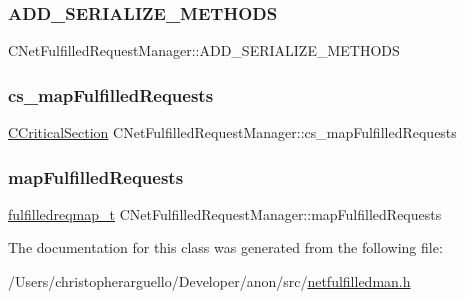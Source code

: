 \subsubsection{\texorpdfstring{A\+D\+D\+\_\+\+S\+E\+R\+I\+A\+L\+I\+Z\+E\+\_\+\+M\+E\+T\+H\+O\+DS}{ADD\_SERIALIZE\_METHODS}}
{\footnotesize\ttfamily C\+Net\+Fulfilled\+Request\+Manager\+::\+A\+D\+D\+\_\+\+S\+E\+R\+I\+A\+L\+I\+Z\+E\+\_\+\+M\+E\+T\+H\+O\+DS}

\mbox{\label{class_c_net_fulfilled_request_manager_a0bdc65b6b9e522c95cec8fe21f04cc72}} 
\subsubsection{\texorpdfstring{cs\+\_\+map\+Fulfilled\+Requests}{cs\_mapFulfilledRequests}}
{\footnotesize\ttfamily \mbox{\hyperlink{sync_8h_a37a4692b2d517f2843655ca11af7668a}{C\+Critical\+Section}} C\+Net\+Fulfilled\+Request\+Manager\+::cs\+\_\+map\+Fulfilled\+Requests\hspace{0.3cm}{\ttfamily [private]}}

\mbox{\label{class_c_net_fulfilled_request_manager_af0ebb4a55c60aca33d85295caa611ecf}} 
\subsubsection{\texorpdfstring{map\+Fulfilled\+Requests}{mapFulfilledRequests}}
{\footnotesize\ttfamily \mbox{\hyperlink{class_c_net_fulfilled_request_manager_a08e49de0fb5f459a2238c98720b1b420}{fulfilledreqmap\+\_\+t}} C\+Net\+Fulfilled\+Request\+Manager\+::map\+Fulfilled\+Requests\hspace{0.3cm}{\ttfamily [private]}}



The documentation for this class was generated from the following file\+:\begin{DoxyCompactItemize}
\item 
/\+Users/christopherarguello/\+Developer/anon/src/\mbox{\hyperlink{netfulfilledman_8h}{netfulfilledman.\+h}}\end{DoxyCompactItemize}
